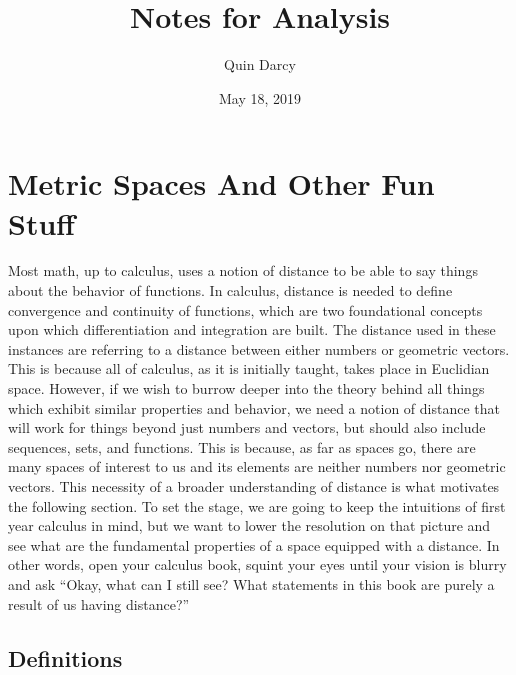 \documentclass{article}
\theoremstyle{definition}
\theoremstyle{remark}
\theoremstyle{definition}
\begin{document}
\title{Notes for Analysis}
\author{Quin Darcy}
\date{May 18, 2019}
\maketitle

\section{Metric Spaces And Other Fun Stuff}

Most math, up to calculus, uses a notion of distance to be able to say things about the behavior of functions. In calculus, distance is needed to define convergence and continuity of functions, which are two foundational concepts upon which differentiation and integration are built. The distance used in these instances are referring to a distance between either numbers or geometric vectors. This is because all of calculus, as it is initially taught, takes place in Euclidian space. However, if we wish to burrow deeper into the theory behind all things which exhibit similar properties and behavior, we need a notion of distance that will work for things beyond just numbers and vectors, but should also include sequences, sets, and functions. This is because, as far as spaces go, there are many spaces of interest to us and its elements are neither numbers nor geometric vectors. This necessity of a broader understanding of distance is what motivates the following section. To set the stage, we are going to keep the intuitions of first year calculus in mind, but we want to lower the resolution on that picture and see what are the fundamental properties of a space equipped with a distance. In other words, open your calculus book, squint your eyes until your vision is blurry and ask ``Okay, what can I still see? What statements in this book are purely a result of us having distance?''

\newpage

\subsection{Definitions}

\vspace{0.5mm}

\hline

\vspace{4mm}
\end{document}
